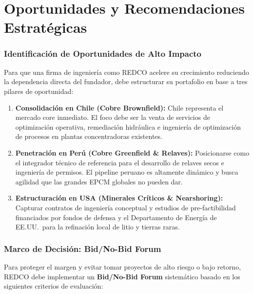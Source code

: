 \chapter{Oportunidades y Recomendaciones Estratégicas}

\subsection{Identificación de Oportunidades de Alto Impacto}

Para que una firma de ingeniería como REDCO acelere su crecimiento reduciendo la dependencia directa del fundador, debe estructurar su portafolio en base a tres pilares de oportunidad:

\begin{enumerate}
    \item \textbf{Consolidación en Chile (Cobre Brownfield):} Chile representa el mercado core inmediato. El foco debe ser la venta de servicios de optimización operativa, remediación hidráulica e ingeniería de optimización de procesos en plantas concentradoras existentes.
    \item \textbf{Penetración en Perú (Cobre Greenfield \& Relaves):} Posicionarse como el integrador técnico de referencia para el desarrollo de relaves secos e ingeniería de permisos. El pipeline peruano es altamente dinámico y busca agilidad que las grandes EPCM globales no pueden dar.
    \item \textbf{Estructuración en USA (Minerales Críticos \& Nearshoring):} Capturar contratos de ingeniería conceptual y estudios de pre-factibilidad financiados por fondos de defensa y el Departamento de Energía de EE.UU.\ para la refinación local de litio y tierras raras.
\end{enumerate}

\subsection{Marco de Decisión: Bid/No-Bid Forum}

Para proteger el margen y evitar tomar proyectos de alto riesgo o bajo retorno, REDCO debe implementar un \textbf{Bid/No-Bid Forum} sistemático basado en los siguientes criterios de evaluación:

